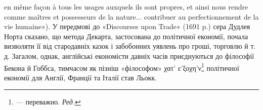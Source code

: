 en même façon à tous les usages auxquels ils sont propres, et ainsi nous
rendre comme maîtres et possesseurs de la nature... contribuer au perfectionnement
de la vie humaine»). У передмові до «Discourses upon Trade»
(1691 p.) сера Дудлея Норта сказано, що метода Декарта, застосована
до політичної економії, почала визволяти її від стародавніх казок і забобонних
уявлень про гроші, торговлю й т. д. Загалом, однак, англійські
економісти давніх часів приєднуються до філософії Бекона й Гоббса, тимчасом
як пізніш «філософом» χατ’ ε’ξοχη'ν\footnote*{
— переважно. \emph{Ред.}
} політичної економії для Англії,
Франції та Італії став Льокк.
\parbreak{}  %
